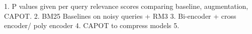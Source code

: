 1. P values given per query relevance scores comparing baseline, augmentation, CAPOT.
2. BM25 Baselines on noisy queries + RM3
3. Bi-encoder + cross encoder/ poly encoder
4. CAPOT to compress models
5. 